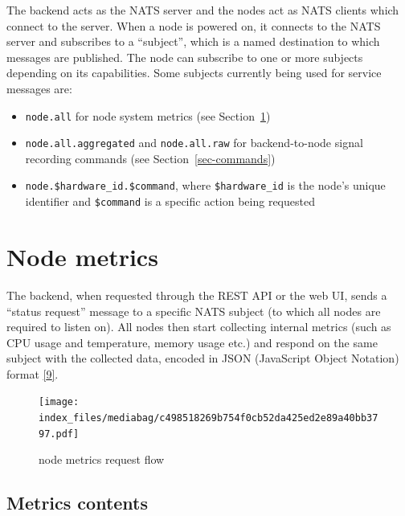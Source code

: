 \documentclass[
  letterpaper,
  a4paper,
  12pt,
  titlepage,
  oneside,
  openany]{book}
\providecommand{\tightlist}{%
  \setlength{\itemsep}{0pt}\setlength{\parskip}{0pt}}\usepackage{longtable,booktabs,array}
\begin{document}
The backend acts as the NATS server and the nodes act as NATS clients
which connect to the server. When a node is powered on, it connects to
the NATS server and subscribes to a \enquote{subject}, which is a named
destination to which messages are published. The node can subscribe to
one or more subjects depending on its capabilities. Some subjects
currently being used for service messages are:

\begin{itemize}
\tightlist
\item
  \texttt{node.all} for node system metrics (see
  Section~\ref{sec-metrics})
\item
  \texttt{node.all.aggregated} and \texttt{node.all.raw} for
  backend-to-node signal recording commands (see
  Section~\ref{sec-commands})
\item
  \texttt{node.\$hardware\_id.\$command}, where \texttt{\$hardware\_id}
  is the node's unique identifier and \texttt{\$command} is a specific
  action being requested
\end{itemize}

\hypertarget{sec-metrics}{%
\section{Node metrics}\label{sec-metrics}}

The backend, when requested through the REST API or the web UI, sends a
\enquote{status request} message to a specific NATS subject (to which
all nodes are required to listen on). All nodes then start collecting
internal metrics (such as CPU usage and temperature, memory usage etc.)
and respond on the same subject with the collected data, encoded in JSON
(JavaScript Object Notation) format
\protect\hyperlink{ref-ecmaECMA404JSONData2017}{{[}9{]}}.

\begin{figure}[h!]

{\centering \texttt{[image: index\_files/mediabag/c498518269b754f0cb52da425ed2e89a40bb3797.pdf]}

}

\caption{\label{fig-metrics}node metrics request flow}

\end{figure}

\hypertarget{metrics-contents}{%
\subsection{Metrics contents}\label{metrics-contents}}
\end{document}

